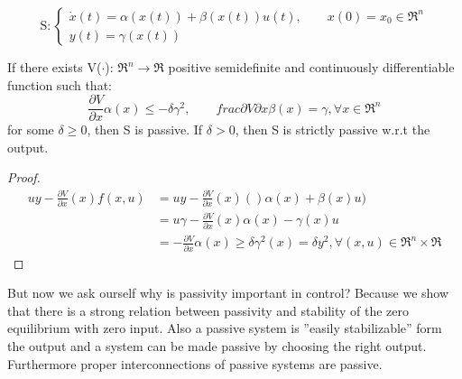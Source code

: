 \[\text{S}: \begin{cases}
\dot{x}(t)=\alpha(x(t))+\beta(x(t))u(t), \qquad x(0)=x_0\in\Re^n\\
y(t)=\gamma(x(t))
\end{cases}
\]
\begin{prop}
	If there exists V($\cdot$): $\Re^n \to \Re$ positive semidefinite and continuously differentiable function such that: \[\frac{\partial V}{\partial x}\alpha(x)\le -\delta \gamma^2, \qquad frac{\partial V}{\partial x}\beta(x) = \gamma, \forall x \in \Re^n\] for some $\delta\ge0$, then S is passive. If $\delta>0$, then S is strictly passive w.r.t the output.
\end{prop}
\begin{proof}
	\[
	\begin{aligned}
		uy-\frac{\partial V}{\partial x}(x)f(x,u)&=uy-\frac{\partial V}{\partial x}(x)()\alpha(x)+\beta(x)u)\\
		&=u\gamma-\frac{\partial V}{\partial x}(x)\alpha(x)-\gamma(x)u\\
		&=-\frac{\partial V}{\partial x}\alpha(x)\ge \delta\gamma^2(x)=\delta y^2, \forall(x,u)\in\Re^n\times\Re
	\end{aligned}
	\]
\end{proof}
But now we ask ourself why is passivity important in control? Because we show that there is a strong relation between passivity and stability of the zero equilibrium with zero input. Also a passive system is ''easily stabilizable'' form the output and a system can be made passive by choosing the right output. Furthermore proper interconnections of passive systems are passive.
